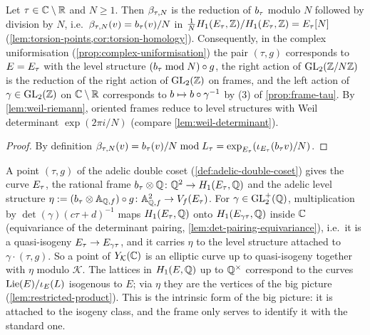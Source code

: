\begin{proposition}
\label{prop:level-from-frames}
Let $\tau \in \mathbb{C}\setminus\mathbb{R}$ and $N \geq 1$. Then $\beta_{\tau,N}$ is the
reduction of $b_{\tau}$ modulo $N$ followed by division by $N$,
i.e.\ $\beta_{\tau,N}(v) = b_{\tau}(v)/N$ in
$\tfrac{1}{N}H_{1}(E_{\tau},\mathbb{Z})/H_{1}(E_{\tau},\mathbb{Z}) =
E_{\tau}[N]$ (\cref{lem:torsion-points,cor:torsion-homology}). Consequently, in the complex
uniformisation (\cref{prop:complex-uniformisation}) the pair $(\tau, g)$
corresponds to $E = E_{\tau}$ with the level structure
$(b_{\tau} \bmod N)\circ g$, the right action of
$\GL{2}{\ResidueRing{N}}$ is the reduction of the right action of
$\GL{2}{\ZZ}$ on frames, and the left action of $\gamma \in \GL{2}{\ZZ}$ on
$\mathbb{C}\setminus\mathbb{R}$ corresponds to $b \mapsto b\circ\gamma^{-1}$ by (3)
of \cref{prop:frame-tau}. By \cref{lem:weil-riemann}, oriented frames
reduce to level structures with Weil determinant $\exp(2\pi i/N)$
(compare \cref{lem:weil-determinant}).
\end{proposition}

\begin{proof}
By definition $\beta_{\tau,N}(v) = b_{\tau}(v)/N \bmod
L_{\tau} = \exp_{E_{\tau}}(\iota_{E_{\tau}}
(b_{\tau}v)/N)$.
\end{proof}

\begin{remark}\label{rem:rational-frames}
A point $(\tau, g)$ of the adelic double coset (\cref{def:adelic-double-coset})
gives the curve $E_{\tau}$, the rational frame
$b_{\tau}\otimes\mathbb{Q} \colon \mathbb{Q}^{2} \to
H_{1}(E_{\tau},\mathbb{Q})$ and the adelic level structure
$\eta := (b_{\tau}\otimes\mathbb{A}_{\mathbb{Q},f})\circ g \colon
\mathbb{A}_{\mathbb{Q},f}^{2} \to V_{f}(E_{\tau})$.
For $\gamma \in \mathrm{GL}_{2}^{+}(\mathbb{Q})$, multiplication by
$\det(\gamma)(c\tau+d)^{-1}$ maps $H_{1}(E_{\tau},\mathbb{Q})$ onto
$H_{1}(E_{\gamma\tau},\mathbb{Q})$ inside $\mathbb{C}$ (equivariance of the
determinant pairing, \cref{lem:det-pairing-equivariance}), i.e.\ it is a
quasi-isogeny $E_{\tau} \to E_{\gamma\tau}$, and it carries
$\eta$ to the level structure attached to $\gamma\cdot(\tau, g)$. So a point
of $Y_{\mathcal{K}}(\mathbb{C})$ is an elliptic curve up to
quasi-isogeny together with $\eta$ modulo $\mathcal{K}$. The lattices in
$H_{1}(E,\mathbb{Q})$ up to $\mathbb{Q}^{\times}$ correspond to the curves
$\mathrm{Lie}(E)/\iota_{E}(L)$ isogenous to $E$; via $\eta$ they are the
vertices of the big picture (\cref{lem:restricted-product}). This is the
intrinsic form of the big picture: it is attached to the isogeny class,
and the frame only serves to identify it with the standard one.
\end{remark}

